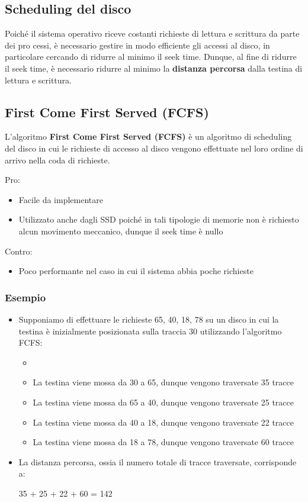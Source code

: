 \documentclass{article}
\begin{document}
\subsection{Scheduling del disco}
Poiché il sistema operativo riceve costanti richieste di lettura e scrittura da parte dei pro cessi, è necessario gestire in modo efficiente gli accessi al disco, in particolare cercando di ridurre al minimo il seek time. Dunque, al fine di ridurre il seek time, è necessario ridurre al minimo la \textbf{distanza percorsa} dalla testina di lettura e scrittura.

\subsection{First Come First Served (FCFS)}
L'algoritmo \textbf{First Come First Served (FCFS)} è un algoritmo di scheduling del disco in cui le richieste di accesso al disco vengono effettuate nel loro ordine di arrivo nella coda di richieste.\par
Pro:
\begin{itemize}
    \item Facile da implementare
    \item Utilizzato anche dagli SSD poiché in tali tipologie di memorie non è richiesto alcun movimento meccanico, dunque il seek time è nullo
\end{itemize}
Contro:
\begin{itemize}
    \item Poco performante nel caso in cui il sistema abbia poche richieste
\end{itemize}
\subsubsection{Esempio}
\begin{itemize}
    \item Supponiamo di effettuare le richieste 65, 40, 18, 78 su un disco in cui la testina è inizialmente posizionata sulla traccia 30 utilizzando l'algoritmo FCFS:
    \begin{itemize}
        \item 
        \item La testina viene mossa da 30 a 65, dunque vengono traversate 35 tracce 
        \item La testina viene mossa da 65 a 40, dunque vengono traversate 25 tracce 
        \item La testina viene mossa da 40 a 18, dunque vengono traversate 22 tracce 
        \item La testina viene mossa da 18 a 78, dunque vengono traversate 60 tracce
    \end{itemize}
    \item La distanza percorsa, ossia il numero totale di tracce traversate, corrisponde a:
    \begin{center}
        35 + 25 + 22 + 60 = 142
    \end{center}
\end{itemize}
\end{document}
